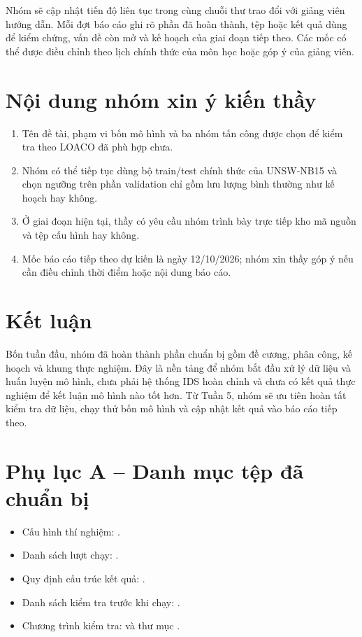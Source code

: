 \documentclass[12pt,a4paper,oneside]{article}
\begin{document}
Nhóm sẽ cập nhật tiến độ liên tục trong cùng chuỗi thư trao đổi với giảng viên hướng dẫn. Mỗi đợt báo cáo ghi rõ phần đã hoàn thành, tệp hoặc kết quả dùng để kiểm chứng, vấn đề còn mở và kế hoạch của giai đoạn tiếp theo. Các mốc có thể được điều chỉnh theo lịch chính thức của môn học hoặc góp ý của giảng viên.

\section{Nội dung nhóm xin ý kiến thầy}
\begin{enumerate}[label=\arabic*.,leftmargin=1.1cm,itemsep=0.25em]
\item Tên đề tài, phạm vi bốn mô hình và ba nhóm tấn công được chọn để kiểm tra theo LOACO đã phù hợp chưa.
\item Nhóm có thể tiếp tục dùng bộ train/test chính thức của UNSW-NB15 và chọn ngưỡng trên phần validation chỉ gồm lưu lượng bình thường như kế hoạch hay không.
\item Ở giai đoạn hiện tại, thầy có yêu cầu nhóm trình bày trực tiếp kho mã nguồn và tệp cấu hình hay không.
\item Mốc báo cáo tiếp theo dự kiến là ngày 12/10/2026; nhóm xin thầy góp ý nếu cần điều chỉnh thời điểm hoặc nội dung báo cáo.
\end{enumerate}

\section{Kết luận}

Bốn tuần đầu, nhóm đã hoàn thành phần chuẩn bị gồm đề cương, phân công, kế hoạch và khung thực nghiệm. Đây là nền tảng để nhóm bắt đầu xử lý dữ liệu và huấn luyện mô hình, chưa phải hệ thống IDS hoàn chỉnh và chưa có kết quả thực nghiệm để kết luận mô hình nào tốt hơn. Từ Tuần 5, nhóm sẽ ưu tiên hoàn tất kiểm tra dữ liệu, chạy thử bốn mô hình và cập nhật kết quả vào báo cáo tiếp theo.

\section*{Phụ lục A -- Danh mục tệp đã chuẩn bị}
\begin{itemize}[leftmargin=1.05cm,itemsep=0.35em]
\item Cấu hình thí nghiệm: .
\item Danh sách lượt chạy: .
\item Quy định cấu trúc kết quả: .
\item Danh sách kiểm tra trước khi chạy: .
\item Chương trình kiểm tra:  và thư mục .
\end{itemize}
\end{document}
